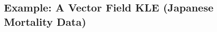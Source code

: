 \documentclass{article}
\numberwithin{theorem}{section}
\numberwithin{lemma}{section}
\numberwithin{definition}{section}
\numberwithin{assumption}{section}
\numberwithin{proposition}{section}
\numberwithin{remark}{section}
\numberwithin{corollary}{section}
\numberwithin{conjecture}{section}
\numberwithin{example}{section}
\newcommand{\aset}[1]{\left \langle #1 \right \rangle}
\begin{document}
\begin{multicols*}{2}

\section{Example: A Vector Field KLE (Japanese Mortality Data)}


\end{multicols*}
\end{document}
